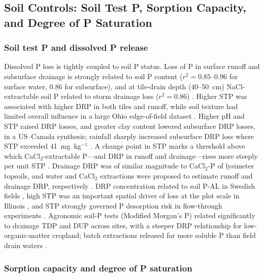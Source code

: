 \subsection{Soil Controls: Soil Test P, Sorption Capacity, and Degree of P Saturation}

\subsubsection{Soil test P and dissolved P release}

Dissolved P loss is tightly coupled to soil P status. Loss of P in surface runoff and
subsurface drainage is strongly related to soil P content
($r^2 = 0.85$--0.96 for surface water, 0.86 for subsurface), and at tile-drain depth
(40--50~cm) NaCl-extractable soil P related to storm drainage loss ($r^2=0.86$)
\parencite{Sharpley1995}. Higher STP was associated with higher DRP in both tiles and
runoff, while soil texture had limited overall influence in a large Ohio edge-of-field
dataset \parencite{Osterholz2020}. Higher pH and STP raised DRP losses, and greater
clay content lowered subsurface DRP losses, in a US--Canada synthesis; rainfall sharply
increased subsurface DRP loss where STP exceeded 41~mg~kg$^{-1}$
\parencite{Ni2020}. A change point in STP marks a threshold above which
CaCl$_2$-extractable P---and DRP in runoff and drainage---rises more steeply per unit
STP \parencite{McDowell2001b}. Drainage DRP was of similar magnitude to CaCl$_2$-P of
lysimeter topsoils, and water and CaCl$_2$ extractions were proposed to estimate runoff
and drainage DRP, respectively \parencite{McDowell2001b}. DRP concentration related to
soil P-AL in Swedish fields \parencite{Ulén2016}, high STP was an important spatial
driver of loss at the plot scale in Illinois \parencite{deOliveira2022}, and STP
strongly governed P desorption risk in flow-through experiments
\parencite{Mumbi2024}. Agronomic soil-P tests (Modified Morgan's P) related
significantly to drainage TDP and DUP across sites, with a steeper DRP relationship for
low-organic-matter cropland; batch extractions released far more soluble P than field
drain waters \parencite{Stutter2018}.

\subsubsection{Sorption capacity and degree of P saturation}

